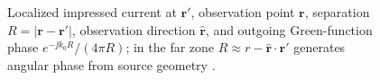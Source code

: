 \begin{figure}[t]
\centering
\VolIPhysFig{\VolIPhysGreenFunctionGeometry}
\caption{Localized impressed current at $\mathbf{r}'$, observation point $\mathbf{r}$, separation $R=|\mathbf{r}-\mathbf{r}'|$, observation direction $\hat{\mathbf{r}}$, and outgoing Green-function phase $e^{-\jj k_0 R}/(4\pi R)$; in the far zone $R\approx r-\hat{\mathbf{r}}\cdot\mathbf{r}'$ generates angular phase from source geometry \cite{stratton1941,jackson1999,tai1994}.}
\label{fig:ch1.green-function-seed}
\end{figure}

